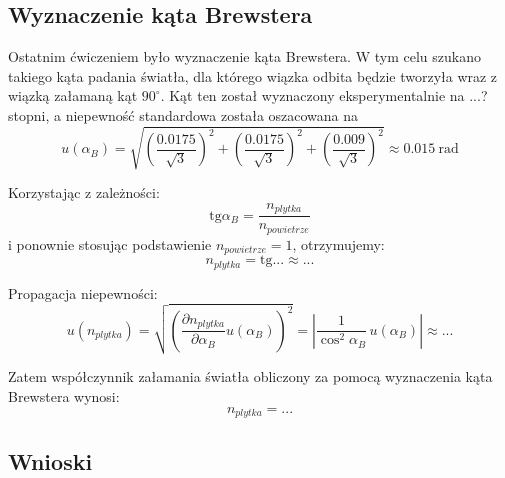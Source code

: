 \documentclass[a4paper]{article}
\begin{document}
\subsection{Wyznaczenie kąta Brewstera}
Ostatnim ćwiczeniem było wyznaczenie kąta Brewstera.
W tym celu szukano takiego kąta padania światła, dla którego wiązka odbita będzie tworzyła wraz z wiązką załamaną kąt $90^\circ$.
Kąt ten został wyznaczony eksperymentalnie na ...? stopni, a niepewność standardowa została oszacowana na \[
	u(\alpha_B) =\sqrt{ 
		  \left( \frac{0.0175}{\sqrt{3}} \right)^2 
		+ \left( \frac{0.0175}{\sqrt{3}} \right)^2
		+ \left( \frac{0.009}{\sqrt{3}} \right)^2
	}
	 \approx 0.015 \ \text{rad}
\]

Korzystając z zależności:
\[
	\text{tg}\alpha_B = \frac{n_{plytka}}{n_{powietrze}}
\]
i ponownie stosując podstawienie $n_{powietrze} = 1$, otrzymujemy:
\[
	n_{plytka} = \text{tg}... \approx ...
\]

Propagacja niepewności:
\[
	u(n_{plytka})
		= \sqrt{
			\left( \frac{\partial n_{plytka}}{\partial \alpha_B}u(\alpha_B)\right)^2
		}
		=	\left| \frac{1}{\cos^2 \alpha_B} \, u(\alpha_B) \right| 
		\approx ...
\]

Zatem współczynnik załamania światła obliczony za pomocą wyznaczenia kąta Brewstera wynosi:
\[
	n_{plytka} = ...
\]
\subsection{Wnioski}
\end{document}
